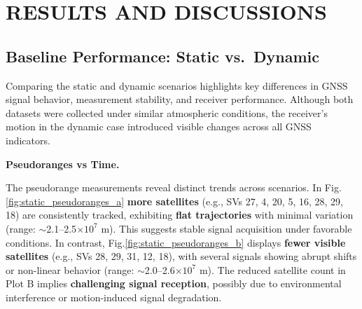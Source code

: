
\section{RESULTS AND DISCUSSIONS} \label{sec:results}

    \subsection{Baseline Performance: Static vs.\ Dynamic}

        Comparing the static and dynamic scenarios highlights key differences in GNSS signal behavior, measurement stability, and receiver performance. 
        Although both datasets were collected under similar atmospheric conditions, the receiver's motion in the dynamic case introduced visible changes across all GNSS indicators.
    
        \vspace{0.5em}
        \noindent \textbf{Pseudoranges vs Time.}
        
        \noindent The pseudorange measurements reveal distinct trends across scenarios. 
        In Fig. \ref{fig:static_pseudoranges_a} \textbf{more satellites} (e.g., SVs 27, 4, 20, 5, 16, 28, 29, 18) are consistently tracked, exhibiting \textbf{flat trajectories} with minimal variation (range: $\sim$2.1--2.5$\times 10^7$ m). 
        This suggests stable signal acquisition under favorable conditions. In contrast, Fig.\ref{fig:static_pseudoranges_b} displays \textbf{fewer visible satellites} (e.g., SVs 28, 29, 31, 12, 18), with several signals showing abrupt shifts or non-linear behavior (range: $\sim$2.0--2.6$\times 10^7$ m). 
        The reduced satellite count in Plot B implies \textbf{challenging signal reception}, possibly due to environmental interference or motion-induced signal degradation.  

